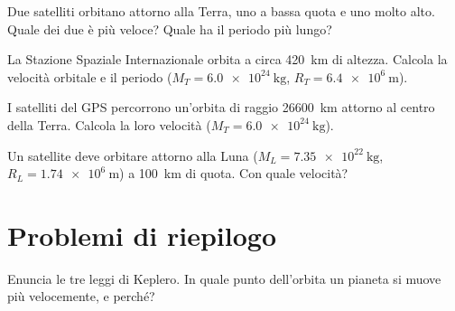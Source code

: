 \begin{esercizio}
Due satelliti orbitano attorno alla Terra, uno a bassa quota e uno molto alto. Quale dei due è più veloce? Quale ha il periodo più lungo?\\
\end{esercizio}

\begin{esercizio}
La Stazione Spaziale Internazionale orbita a circa \SI{420}{\kilo\metre} di altezza. Calcola la velocità orbitale e il periodo ($M_T = \SI{6,0e24}{\kilo\gram}$, $R_T = \SI{6,4e6}{\metre}$).\\
\end{esercizio}

\begin{esercizio}
I satelliti del GPS percorrono un'orbita di raggio \SI{26600}{\kilo\metre} attorno al centro della Terra. Calcola la loro velocità ($M_T = \SI{6,0e24}{\kilo\gram}$).\\
\end{esercizio}

\begin{esercizio}
Un satellite deve orbitare attorno alla Luna ($M_L = \SI{7,35e22}{\kilo\gram}$, $R_L = \SI{1,74e6}{\metre}$) a \SI{100}{\kilo\metre} di quota. Con quale velocità?\\
\end{esercizio}

\section{Problemi di riepilogo}

\begin{esercizio}
Enuncia le tre leggi di Keplero. In quale punto dell'orbita un pianeta si muove più velocemente, e perché?\\
\end{esercizio}


